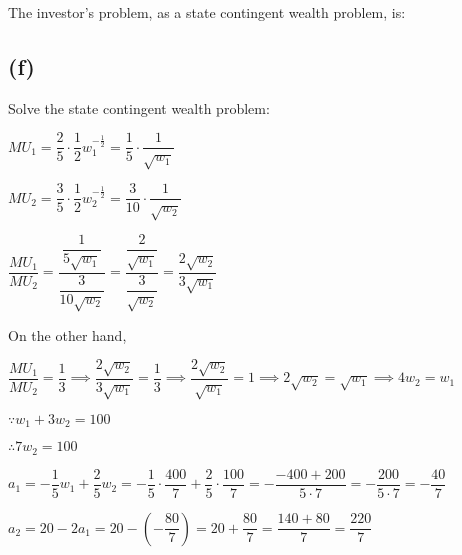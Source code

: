 \documentclass{article}
\begin{document}
The investor's problem, as a state contingent wealth problem, is:


\subsection*{(f)}

Solve the state contingent wealth problem:

$MU_{1}=\dfrac{2}{5}\cdot\dfrac{1}{2}w_{1}^{-\frac{1}{2}}=\dfrac{1}{5}\cdot\dfrac{1}{\sqrt{w_{1}}}$

$MU_{2}=\dfrac{3}{5}\cdot\dfrac{1}{2}w_{2}^{-\frac{1}{2}}=\dfrac{3}{10}\cdot\dfrac{1}{\sqrt{w_{2}}}$

$\dfrac{MU_{1}}{MU_{2}}=\dfrac{\dfrac{1}{5\sqrt{w_{1}}}}{\dfrac{3}{10\sqrt{w_{2}}}}=\dfrac{\dfrac{2}{\sqrt{w_{1}}}}{\dfrac{3}{\sqrt{w_{2}}}}=\dfrac{2\sqrt{w_{2}}}{3\sqrt{w_{1}}}$

On the other hand, 

$\dfrac{MU_{1}}{MU_{2}}=\dfrac{1}{3}\implies\dfrac{2\sqrt{w_{2}}}{3\sqrt{w_{1}}}=\dfrac{1}{3}\implies\dfrac{2\sqrt{w_{2}}}{\sqrt{w_{1}}}=1\implies2\sqrt{w_{2}}=\sqrt{w_{1}}\implies4w_{2}=w_{1}$

$\because w_{1}+3w_{2}=100$

$\therefore 7w_{2}=100$

\begin{spacing}{1.8}
\end{spacing}

$a_{1}=-\dfrac{1}{5}w_{1}+\dfrac{2}{5}w_{2}=-\dfrac{1}{5}\cdot\dfrac{400}{7}+\dfrac{2}{5}\cdot\dfrac{100}{7}=-\dfrac{-400+200}{5\cdot7}=-\dfrac{200}{5\cdot7}=\boxed{-\dfrac{40}{7}}$

$a_{2}=20-2a_{1}=20-\left(-\dfrac{80}{7}\right)=20+\dfrac{80}{7}=\dfrac{140+80}{7}=\boxed{\dfrac{220}{7}}$
\end{document}
